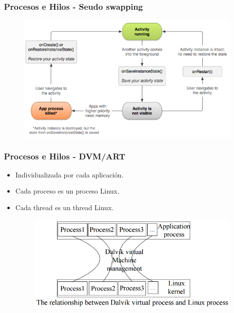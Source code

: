 \begin{frame}
  \frametitle{Procesos e Hilos - Seudo swapping}
  \begin{figure}
      \centering
      \includegraphics[scale=0.5]{images/restore-instance.png}
  \end{figure}
\end{frame}

\begin{frame}
  \frametitle{Procesos e Hilos - DVM/ART}
  \begin{itemize}
      \item Individualizada por cada aplicación.
      
      \item Cada proceso es un proceso Linux.
      
      \item Cada thread es un thread Linux.
      
      \begin{figure}
  \centering
  \includegraphics[scale=0.3]{images/dvm-linux-processes.png}
      \end{figure}
  \end{itemize}
\end{frame}


